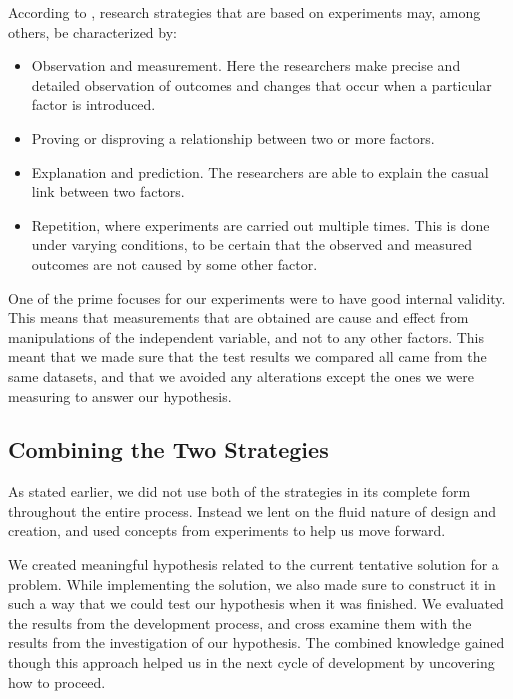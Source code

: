 According to \citep{oates2005researching}, research strategies that are based on experiments may, among others, be characterized by:

\begin{itemize}
    \item Observation and measurement. Here the researchers make precise and detailed observation of outcomes and changes that occur when a particular factor is introduced.
    \item Proving or disproving a relationship between two or more factors.
    \item Explanation and prediction. The researchers are able to explain the casual link between two factors.
    \item Repetition, where experiments are carried out multiple times. This is done under varying conditions, to be certain that the observed and measured outcomes are not caused by some other factor.
\end{itemize}

One of the prime focuses for our experiments were to have good internal validity. This means that measurements that are obtained are cause and effect from manipulations of the independent variable, and not to any other factors. This meant that we made sure that the test results we compared all came from the same datasets, and that we avoided any alterations except the ones we were measuring to answer our hypothesis.

\subsection{Combining the Two Strategies}
\label{sec:combining_the_two_strategies}
As stated earlier, we did not use both of the strategies in its complete form throughout the entire process. Instead we lent on the fluid nature of design and creation, and used concepts from experiments to help us move forward. 

We created meaningful hypothesis related to the current tentative solution for a problem. While implementing the solution, we also made sure to construct it in such a way that we could test our hypothesis when it was finished. We evaluated the results from the development process, and cross examine them with the results from the investigation of our hypothesis. The combined knowledge gained though this approach helped us in the next cycle of development by uncovering how to proceed.


